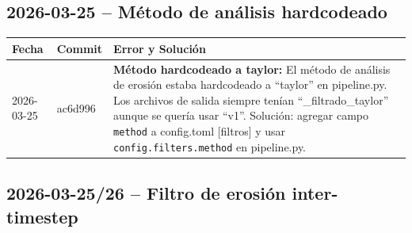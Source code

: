 \documentclass[12pt,a4paper]{article}
\begin{document}
\subsection*{2026-03-25 -- Método de análisis hardcodeado}

\begin{table}[H]
	\centering
	\begin{tabular}{@{}llp{9cm}@{}}
		\toprule
		\textbf{Fecha} & \textbf{Commit} & \textbf{Error y Solución}                                                                                                                                                                                                                                                                                                               \\
		\midrule
		2026-03-25     & ac6d996         & \textbf{Método hardcodeado a taylor:} El método de análisis de erosión estaba hardcodeado a ``taylor'' en pipeline.py. Los archivos de salida siempre tenían ``\_filtrado\_taylor'' aunque se quería usar ``v1''. Solución: agregar campo \texttt{method} a config.toml [filtros] y usar \texttt{config.filters.method} en pipeline.py. \\
		\bottomrule
	\end{tabular}
\end{table}

\subsection*{2026-03-25/26 -- Filtro de erosión inter-timestep}
\end{document}
